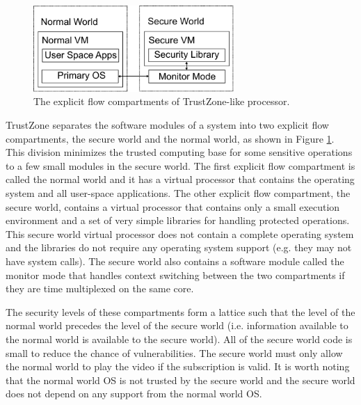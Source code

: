     \begin{figure}
        \begin{center}
            \includegraphics[width=3in]{figs/worlds.pdf}
            \caption{The explicit flow compartments of TrustZone-like 
            processor.}
            \label{fig:tz_domains}
        \end{center}
    \end{figure}

    TrustZone separates the software modules of a system into two explicit flow 
    compartments, the secure world and the normal world, as shown in Figure 
    \ref{fig:tz_domains}.
    This division minimizes the trusted computing base for some sensitive
    operations to a few small modules in the secure world.
    The first explicit flow compartment is called the normal world and it has a 
    virtual processor that contains the operating system and all user-space 
    applications. The other explicit flow compartment, the secure world, 
    contains a virtual processor that contains only a small execution 
    environment and a set of very simple libraries for handling protected 
    operations. This secure world virtual processor does not contain a complete 
    operating system and the libraries do not require any operating system 
    support (e.g. they may not have system calls). The secure world also 
    contains a software module called the monitor mode that handles context switching 
    between the two compartments if they are time multiplexed on the same core.

    The security levels of these compartments form a lattice such that the 
    level of the normal world precedes the level of the secure world (i.e. 
    information available to the normal world is available to the secure 
    world). All of the secure world code is small to reduce the chance of 
    vulnerabilities. The secure world must only allow the normal world to play 
    the video if the subscription is valid. It is worth noting that the normal 
    world OS is not trusted by the secure world and the secure world does not 
    depend on any support from the normal world OS.


